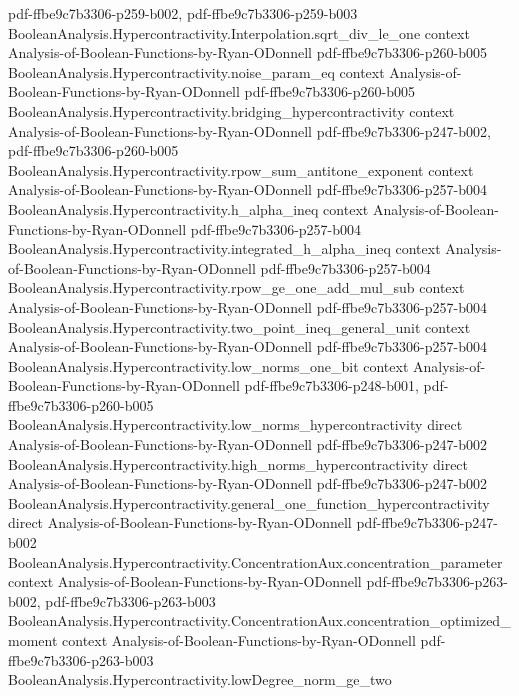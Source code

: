 \begin{theorem}
  {pdf-ffbe9c7b3306-p259-b002,
    pdf-ffbe9c7b3306-p259-b003}
\proofstep
  {BooleanAnalysis.Hypercontractivity.Interpolation.sqrt_div_le_one}
  {context}
  {Analysis-of-Boolean-Functions-by-Ryan-ODonnell}
  {pdf-ffbe9c7b3306-p260-b005}
\proofstep
  {BooleanAnalysis.Hypercontractivity.noise_param_eq}
  {context}
  {Analysis-of-Boolean-Functions-by-Ryan-ODonnell}
  {pdf-ffbe9c7b3306-p260-b005}
\proofstep
  {BooleanAnalysis.Hypercontractivity.bridging_hypercontractivity}
  {context}
  {Analysis-of-Boolean-Functions-by-Ryan-ODonnell}
  {pdf-ffbe9c7b3306-p247-b002,
    pdf-ffbe9c7b3306-p260-b005}
\proofstep
  {BooleanAnalysis.Hypercontractivity.rpow_sum_antitone_exponent}
  {context}
  {Analysis-of-Boolean-Functions-by-Ryan-ODonnell}
  {pdf-ffbe9c7b3306-p257-b004}
\proofstep
  {BooleanAnalysis.Hypercontractivity.h_alpha_ineq}
  {context}
  {Analysis-of-Boolean-Functions-by-Ryan-ODonnell}
  {pdf-ffbe9c7b3306-p257-b004}
\proofstep
  {BooleanAnalysis.Hypercontractivity.integrated_h_alpha_ineq}
  {context}
  {Analysis-of-Boolean-Functions-by-Ryan-ODonnell}
  {pdf-ffbe9c7b3306-p257-b004}
\proofstep
  {BooleanAnalysis.Hypercontractivity.rpow_ge_one_add_mul_sub}
  {context}
  {Analysis-of-Boolean-Functions-by-Ryan-ODonnell}
  {pdf-ffbe9c7b3306-p257-b004}
\proofstep
  {BooleanAnalysis.Hypercontractivity.two_point_ineq_general_unit}
  {context}
  {Analysis-of-Boolean-Functions-by-Ryan-ODonnell}
  {pdf-ffbe9c7b3306-p257-b004}
\proofstep
  {BooleanAnalysis.Hypercontractivity.low_norms_one_bit}
  {context}
  {Analysis-of-Boolean-Functions-by-Ryan-ODonnell}
  {pdf-ffbe9c7b3306-p248-b001,
    pdf-ffbe9c7b3306-p260-b005}
\proofstep
  {BooleanAnalysis.Hypercontractivity.low_norms_hypercontractivity}
  {direct}
  {Analysis-of-Boolean-Functions-by-Ryan-ODonnell}
  {pdf-ffbe9c7b3306-p247-b002}
\proofstep
  {BooleanAnalysis.Hypercontractivity.high_norms_hypercontractivity}
  {direct}
  {Analysis-of-Boolean-Functions-by-Ryan-ODonnell}
  {pdf-ffbe9c7b3306-p247-b002}
\proofstep
  {BooleanAnalysis.Hypercontractivity.general_one_function_hypercontractivity}
  {direct}
  {Analysis-of-Boolean-Functions-by-Ryan-ODonnell}
  {pdf-ffbe9c7b3306-p247-b002}
\proofstep
  {BooleanAnalysis.Hypercontractivity.ConcentrationAux.concentration_parameter}
  {context}
  {Analysis-of-Boolean-Functions-by-Ryan-ODonnell}
  {pdf-ffbe9c7b3306-p263-b002,
    pdf-ffbe9c7b3306-p263-b003}
\proofstep
  {BooleanAnalysis.Hypercontractivity.ConcentrationAux.concentration_optimized_moment}
  {context}
  {Analysis-of-Boolean-Functions-by-Ryan-ODonnell}
  {pdf-ffbe9c7b3306-p263-b003}
\proofstep
  {BooleanAnalysis.Hypercontractivity.lowDegree_norm_ge_two}

\end{theorem}
